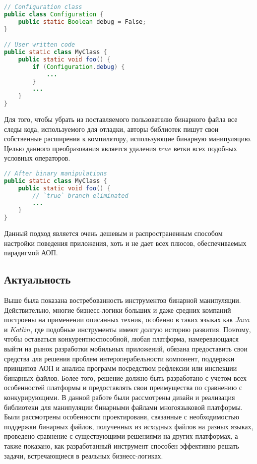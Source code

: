 \begin{lstlisting}[language=Java, caption=Пример использования класса с конфигурацией проекта, label=lst:debug]
// Configuration class
public class Configuration {
    public static Boolean debug = False;
}

// User written code
public static class MyClass {
    public static void foo() {
        if (Configuration.debug) {
            ...
        }
        ...
    }
}
\end{lstlisting}

Для того, чтобы убрать из поставляемого пользователю бинарного файла все следы кода, используемого для отладки, авторы библиотек пишут свои собственные расширения к компилятору, использующие бинарную манипуляцию. Целью данного преобразования является удаления $true$ ветки всех подобных условных операторов.

\begin{lstlisting}[language=Java, caption=Результат работы преобразования, label=lst:debug]
// After binary manipulations
public static class MyClass {
    public static void foo() {
        // `true` branch eliminated
        ...
    }
}
\end{lstlisting}

Данный подход является очень дешевым и распространенным способом настройки поведения приложения, хоть и не дает всех плюсов, обеспечиваемых парадигмой АОП.

\subsection{Актуальность}

Выше была показана востребованность инструментов бинарной манипуляции. Действительно, многие бизнесс-логики больших и даже средних компаний построены на применении описанных техник, особенно в таких языках как $Java$ и $Kotlin$, где подобные инструменты имеют долгую историю развития. Поэтому, чтобы оставаться конкурентноспособной, любая платформа, намеревающаяся выйти на рынок разработки мобильных приложений, обязана предоставить свои средства для решения проблем интероперабельности компонент, поддержки принципов АОП и анализа программ посредством рефлексии или инспекции бинарных файлов. Более того, решение должно быть разработано с учетом всех особенностей платформы и предоставлять свои преимущества по сравнению с конкурирующими. В данной работе были рассмотрены дизайн и реализация библиотеки для манипуляции бинарными файлами многоязыковой платформы. Были рассмотрены особенности проектированя, связанные с необходимостью поддержки бинарных файлов, полученных из исходных файлов на разных языках, проведено сравнение с существующими решениями на других платформах, а также показано, как разработанный инструмент способен эффективно решать задачи, встречающиеся в реальных бизнесс-логиках.

\newpage
